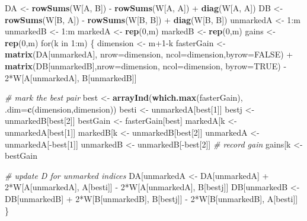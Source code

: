 \documentclass[11pt,]{article}
\newenvironment{Shaded}{\begin{snugshade}}{\end{snugshade}}
\newcommand{\KeywordTok}[1]{\textcolor[rgb]{0.13,0.29,0.53}{\textbf{{#1}}}}
\newcommand{\DataTypeTok}[1]{\textcolor[rgb]{0.13,0.29,0.53}{{#1}}}
\newcommand{\DecValTok}[1]{\textcolor[rgb]{0.00,0.00,0.81}{{#1}}}
\newcommand{\StringTok}[1]{\textcolor[rgb]{0.31,0.60,0.02}{{#1}}}
\newcommand{\CommentTok}[1]{\textcolor[rgb]{0.56,0.35,0.01}{\textit{{#1}}}}
\newcommand{\OtherTok}[1]{\textcolor[rgb]{0.56,0.35,0.01}{{#1}}}
\newcommand{\NormalTok}[1]{{#1}}
\begin{document}
\begin{Shaded}
\begin{Highlighting}[]
  \NormalTok{DA <-}\StringTok{ }\KeywordTok{rowSums}\NormalTok{(W[A, B]) -}\StringTok{ }\KeywordTok{rowSums}\NormalTok{(W[A, A]) +}\StringTok{ }\KeywordTok{diag}\NormalTok{(W[A, A])}
  \NormalTok{DB <-}\StringTok{ }\KeywordTok{rowSums}\NormalTok{(W[B, A]) -}\StringTok{ }\KeywordTok{rowSums}\NormalTok{(W[B, B]) +}\StringTok{ }\KeywordTok{diag}\NormalTok{(W[B, B])}
  \NormalTok{unmarkedA <-}\StringTok{ }\DecValTok{1}\NormalTok{:m}
  \NormalTok{unmarkedB <-}\StringTok{ }\DecValTok{1}\NormalTok{:m}
  \NormalTok{markedA <-}\StringTok{ }\KeywordTok{rep}\NormalTok{(}\DecValTok{0}\NormalTok{,m)}
  \NormalTok{markedB <-}\StringTok{ }\KeywordTok{rep}\NormalTok{(}\DecValTok{0}\NormalTok{,m)}
  \NormalTok{gains <-}\StringTok{ }\KeywordTok{rep}\NormalTok{(}\DecValTok{0}\NormalTok{,m)}
  \NormalTok{for(k in }\DecValTok{1}\NormalTok{:m) \{}
    \NormalTok{dimension <-}\StringTok{ }\NormalTok{m}\DecValTok{+1}\NormalTok{-k}
    \NormalTok{fasterGain <-}\StringTok{ }\KeywordTok{matrix}\NormalTok{(DA[unmarkedA], }\DataTypeTok{nrow=}\NormalTok{dimension, }
                         \DataTypeTok{ncol=}\NormalTok{dimension,}\DataTypeTok{byrow=}\OtherTok{FALSE}\NormalTok{) +}\StringTok{ }
\StringTok{      }\KeywordTok{matrix}\NormalTok{(DB[unmarkedB],}\DataTypeTok{nrow=}\NormalTok{dimension, }\DataTypeTok{ncol=}\NormalTok{dimension, }
             \DataTypeTok{byrow=}\OtherTok{TRUE}\NormalTok{) -}\StringTok{ }
\StringTok{      }\DecValTok{2}\NormalTok{*W[A[unmarkedA], B[unmarkedB]]}
    
    \CommentTok{# mark the best pair}
    \NormalTok{best <-}\StringTok{ }\KeywordTok{arrayInd}\NormalTok{(}\KeywordTok{which.max}\NormalTok{(fasterGain),}
                     \DataTypeTok{.dim=}\KeywordTok{c}\NormalTok{(dimension,dimension))}
    \NormalTok{besti <-}\StringTok{ }\NormalTok{unmarkedA[best[}\DecValTok{1}\NormalTok{]]}
    \NormalTok{bestj <-}\StringTok{ }\NormalTok{unmarkedB[best[}\DecValTok{2}\NormalTok{]]}
    \NormalTok{bestGain <-}\StringTok{ }\NormalTok{fasterGain[best]}
    \NormalTok{markedA[k <-}\StringTok{ }\NormalTok{unmarkedA[best[}\DecValTok{1}\NormalTok{]]}
    \NormalTok{markedB[k <-}\StringTok{ }\NormalTok{unmarkedB[best[}\DecValTok{2}\NormalTok{]]}
    \NormalTok{unmarkedA <-}\StringTok{ }\NormalTok{unmarkedA[-best[}\DecValTok{1}\NormalTok{]]}
    \NormalTok{unmarkedB <-}\StringTok{ }\NormalTok{unmarkedB[-best[}\DecValTok{2}\NormalTok{]]}
    \CommentTok{# record gain}
    \NormalTok{gains[k <-}\StringTok{ }\NormalTok{bestGain}
    
    \CommentTok{# update D for unmarked indices }
    \NormalTok{DA[unmarkedA <-}\StringTok{ }\NormalTok{DA[unmarkedA] +}\StringTok{ }
\StringTok{         }\DecValTok{2}\NormalTok{*W[A[unmarkedA], A[besti]] -}\StringTok{ }
\StringTok{         }\DecValTok{2}\NormalTok{*W[A[unmarkedA], B[bestj]]}
    \NormalTok{DB[unmarkedB <-}\StringTok{ }\NormalTok{DB[unmarkedB] +}\StringTok{ }
\StringTok{         }\DecValTok{2}\NormalTok{*W[B[unmarkedB], B[bestj]] -}\StringTok{ }
\StringTok{         }\DecValTok{2}\NormalTok{*W[B[unmarkedB], A[besti]]}
  \NormalTok{\}}
  

\end{Highlighting}
\end{Shaded}
\end{document}
